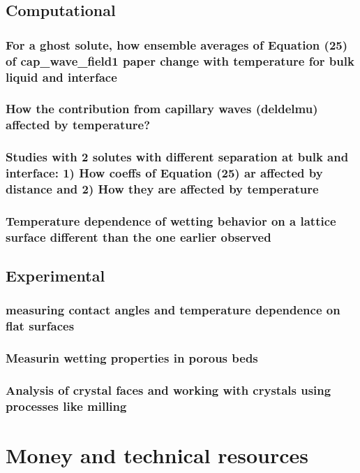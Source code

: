 \documentclass[a4paper,12pt,single,pdftex]{scrartcl}
\begin{document}
\label{ID_1455861183}\subsection{Computational}

\label{ID_485443609}\subsubsection{For a ghost solute, how ensemble averages of Equation (25) of cap_wave_field1 paper change with temperature for bulk liquid and interface}

\label{ID_577294012}\subsubsection{How the contribution from capillary waves (deldelmu) affected by temperature?}

\label{ID_1474088810}\subsubsection{Studies with 2 solutes with different separation at bulk and interface: 1) How coeffs of Equation (25) ar affected by distance and 2) How they are affected by temperature}

\label{ID_1367637509}\subsubsection{Temperature dependence of wetting behavior on a lattice surface different than the one earlier observed}

\label{ID_1178677590}\subsection{Experimental}

\label{ID_1995511474}\subsubsection{measuring contact angles and temperature dependence on flat surfaces}

\label{ID_853592622}\subsubsection{Measurin wetting properties in porous beds}

\label{ID_1635488399}\subsubsection{Analysis of crystal faces and working with crystals using processes like milling}

\label{ID_1082352398}\section{Money and technical resources}


\newpage
\end{document}
